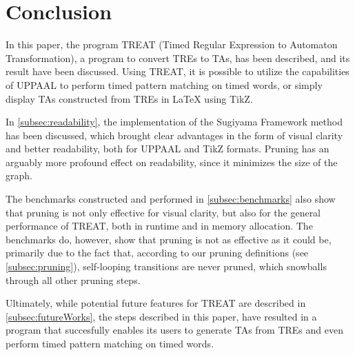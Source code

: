 \section{Conclusion}


In this paper, the program TREAT (Timed Regular Expression to Automaton Transformation), a program to convert TREs to TAs, has been described, and its result have been discussed.
Using TREAT, it is possible to utilize the capabilities of UPPAAL to perform timed pattern matching on timed words, or simply display TAs constructed from TREs in LaTeX using TikZ.

In \cref{subsec:readability}, the implementation of the Sugiyama Framework method has been discussed, which brought clear advantages in the form of visual clarity and better readability, both for UPPAAL and TikZ formats.
Pruning has an arguably more profound effect on readability, since it minimizes the size of the graph.

The benchmarks constructed and performed in \cref{subsec:benchmarks} also show that pruning is not only effective for visual clarity, but also for the general performance of TREAT, both in runtime and in memory allocation.
The benchmarks do, however, show that pruning is not as effective as it could be, primarily due to the fact that, according to our pruning definitions (see \cref{subsec:pruning}), self-looping transitions are never pruned, which snowballs through all other pruning steps.

Ultimately, while potential future features for TREAT are described in \cref{subsec:futureWorks}, the steps described in this paper, have resulted in a program that succesfully enables its users to generate TAs from TREs and even perform timed pattern matching on timed words.